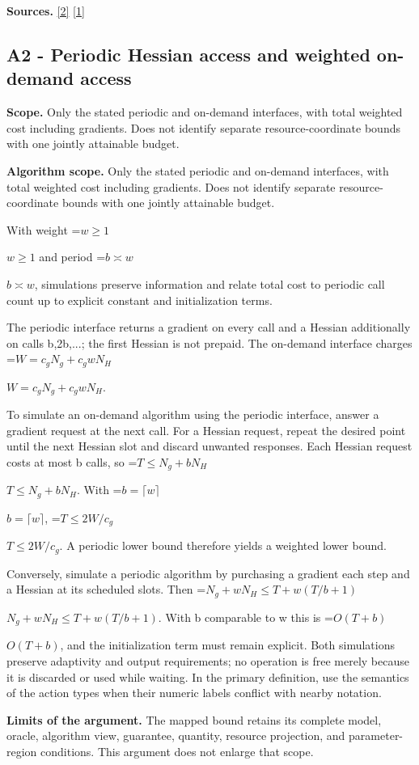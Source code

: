 \documentclass[10pt,a4paper]{article}
\newcommand{\AtlasMath}[1]{\par\begingroup\centering\setbox0=\hbox{$\displaystyle #1$}\ifdim\wd0>1.4\linewidth\typeout{ATLAS WIDE FORMULA: \the\wd0}\fi\ifdim\wd0>\linewidth\resizebox{\linewidth}{!}{\box0}\else\box0\fi\par\endgroup}
\newcommand{\AtlasInlineMath}[1]{\begingroup\setbox0=\hbox{$#1$}\ifdim\wd0>.4\linewidth\endgroup\AtlasMath{#1}\else\endgroup$#1$\fi}
\begin{document}
\textbf{Sources.} \href{https://arxiv.org/abs/1710.11606v3}{[2]} \href{https://arxiv.org/abs/2501.17488v3}{[1]}

\subsection{A2 - Periodic Hessian access and weighted on-demand access}
\textbf{Scope.} Only the stated periodic and on-demand interfaces, with total weighted cost including gradients. Does not identify separate resource-coordinate bounds with one jointly attainable budget.

\textbf{Algorithm scope.} Only the stated periodic and on-demand interfaces, with total weighted cost including gradients. Does not identify separate resource-coordinate bounds with one jointly attainable budget.

With weight \AtlasInlineMath{w\ge1} and period \AtlasInlineMath{b\asymp w}, simulations preserve information and relate total cost to periodic call count up to explicit constant and initialization terms.

The periodic interface returns a gradient on every call and a Hessian additionally on calls b,2b,...; the first Hessian is not prepaid. The on-demand interface charges \AtlasInlineMath{W=c_gN_g+c_gwN_H}.

To simulate an on-demand algorithm using the periodic interface, answer a gradient request at the next call. For a Hessian request, repeat the desired point until the next Hessian slot and discard unwanted responses. Each Hessian request costs at most b calls, so \AtlasInlineMath{T\le N_g+bN_H}. With \AtlasInlineMath{b=\lceil w\rceil}, \AtlasInlineMath{T\le2W/c_g}. A periodic lower bound therefore yields a weighted lower bound.

Conversely, simulate a periodic algorithm by purchasing a gradient each step and a Hessian at its scheduled slots. Then \AtlasInlineMath{N_g+wN_H\le T+w(T/b+1)}. With b comparable to w this is \AtlasInlineMath{O(T+b)}, and the initialization term must remain explicit. Both simulations preserve adaptivity and output requirements; no operation is free merely because it is discarded or used while waiting. In the primary definition, use the semantics of the action types when their numeric labels conflict with nearby notation.

\textbf{Limits of the argument.} The mapped bound retains its complete model, oracle, algorithm view, guarantee, quantity, resource projection, and parameter-region conditions. This argument does not enlarge that scope.
\end{document}
